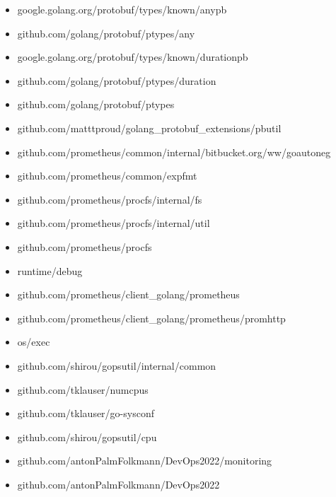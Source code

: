 \begin{itemize}
    \item google.golang.org/protobuf/types/known/anypb
    \item github.com/golang/protobuf/ptypes/any
    \item google.golang.org/protobuf/types/known/durationpb
    \item github.com/golang/protobuf/ptypes/duration
    \item github.com/golang/protobuf/ptypes
    \item github.com/matttproud/golang\_protobuf\_extensions/pbutil
    \item github.com/prometheus/common/internal/bitbucket.org/ww/goautoneg
    \item github.com/prometheus/common/expfmt
    \item github.com/prometheus/procfs/internal/fs
    \item github.com/prometheus/procfs/internal/util
    \item github.com/prometheus/procfs
    \item runtime/debug
    \item github.com/prometheus/client\_golang/prometheus
    \item github.com/prometheus/client\_golang/prometheus/promhttp
    \item os/exec
    \item github.com/shirou/gopsutil/internal/common
    \item github.com/tklauser/numcpus
    \item github.com/tklauser/go-sysconf
    \item github.com/shirou/gopsutil/cpu
    \item github.com/antonPalmFolkmann/DevOps2022/monitoring
    \item github.com/antonPalmFolkmann/DevOps2022
\end{itemize} 